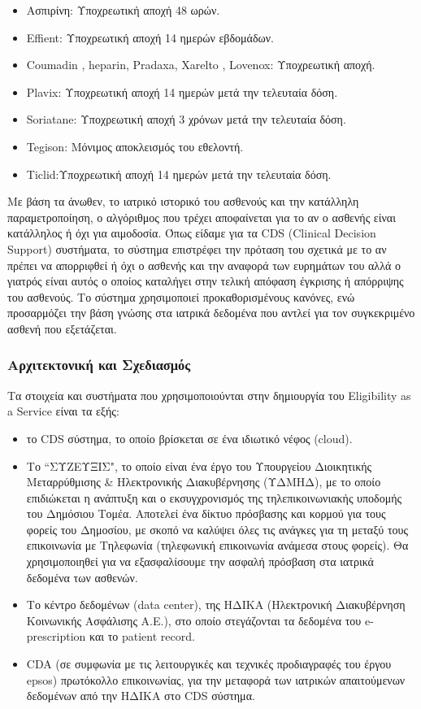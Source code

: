 \begin{itemize}
		\item Ασπιρίνη: Υποχρεωτική αποχή 48 ωρών.
		\item Effient: Υποχρεωτική αποχή 14 ημερών εβδομάδων.
		\item Coumadin , heparin, Pradaxa, Xarelto , Lovenox: Υποχρεωτική αποχή.
		\item Plavix: Υποχρεωτική αποχή 14 ημερών μετά την τελευταία δόση.
		\item Soriatane: Υποχρεωτική αποχή 3 χρόνων μετά την τελευταία δόση.
		\item Tegison: Μόνιμος αποκλεισμός του εθελοντή. 
		\item Ticlid:Υποχρεωτική αποχή 14 ημερών μετά την τελευταία δόση.
	

		\end{itemize}
		
		Με βάση τα άνωθεν, το ιατρικό ιστορικό του ασθενούς και την κατάλληλη παραμετροποίηση, ο αλγόριθμος που τρέχει αποφαίνεται για το αν ο ασθενής είναι κατάλληλος ή όχι για αιμοδοσία. Όπως είδαμε για τα CDS (Clinical Decision Support) συστήματα, το σύστημα επιστρέφει την πρόταση του σχετικά με το αν πρέπει να απορριφθεί ή όχι ο ασθενής και την αναφορά των ευρημάτων του αλλά ο γιατρός είναι αυτός ο οποίος καταλήγει στην τελική απόφαση έγκρισης ή απόρριψης του ασθενούς. Το σύστημα χρησιμοποιεί προκαθορισμένους κανόνες, ενώ προσαρμόζει την βάση γνώσης στα ιατρικά δεδομένα που αντλεί για τον συγκεκριμένο ασθενή που εξετάζεται.
	
		
	\subsubsection{Αρχιτεκτονική και Σχεδιασμός}
		
		Τα στοιχεία και συστήματα που χρησιμοποιούνται στην δημιουργία του Eligibility as a Service είναι τα εξής:
		\begin{itemize}
		\item το CDS σύστημα, το οποίο βρίσκεται σε ένα ιδιωτικό νέφος (cloud).
		\item Το ``ΣΥΖΕΥΞΙΣ", το οποίο είναι ένα έργο του Υπουργείου Διοικητικής Μεταρρύθμισης \& Ηλεκτρονικής Διακυβέρνησης (ΥΔΜΗΔ), με το οποίο επιδιώκεται η ανάπτυξη και ο εκσυγχρονισμός της τηλεπικοινωνιακής υποδομής του Δημόσιου Τομέα. Αποτελεί  ένα δίκτυο πρόσβασης και κορμού για τους φορείς του Δημοσίου, με σκοπό να καλύψει όλες τις ανάγκες για τη μεταξύ τους επικοινωνία με  Τηλεφωνία (τηλεφωνική επικοινωνία ανάμεσα στους φορείς). Θα χρησιμοποιηθεί για να εξασφαλίσουμε την ασφαλή πρόσβαση στα ιατρικά δεδομένα των ασθενών.
		\item Το κέντρο δεδομένων (data center), της ΗΔΙΚΑ (Ηλεκτρονική Διακυβέρνηση Κοινωνικής Ασφάλισης Α.Ε.), στο οποίο στεγάζονται τα δεδομένα του e-prescription και το patient record.
		\item CDA (σε συμφωνία με τις λειτουργικές και τεχνικές προδιαγραφές του έργου epsos) πρωτόκολλο επικοινωνίας, για την μεταφορά των ιατρικών απαιτούμενων δεδομένων από την ΗΔΙΚΑ στο CDS σύστημα.
		\end{itemize}				
		
